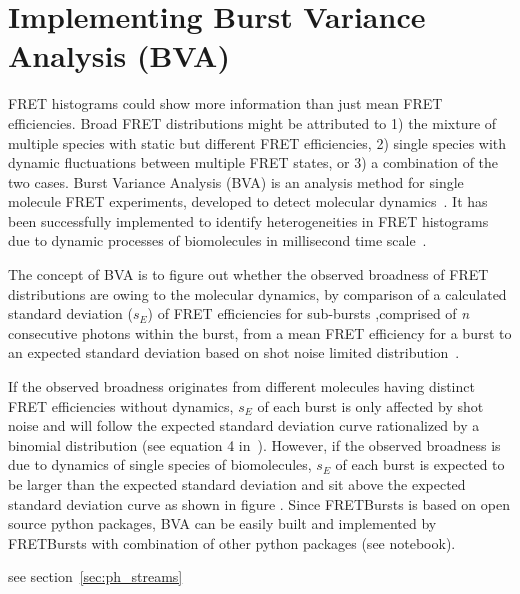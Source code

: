 \section{Implementing Burst Variance Analysis (BVA)}

FRET histograms could show more information than just mean FRET efficiencies. Broad FRET distributions might be attributed to 1) the mixture of multiple species with static but different FRET efficiencies, 2) single species with dynamic fluctuations between multiple FRET states, or 3) a combination of the two cases. Burst Variance Analysis (BVA) is an analysis method for single molecule FRET experiments, developed to detect molecular dynamics~\cite{Torella_2011}. It has been successfully implemented to identify heterogeneities in FRET histograms due to dynamic processes of biomolecules in millisecond time scale~\cite{Torella_2011, Robb_2013}.

The concept of BVA is to figure out whether the observed broadness of FRET distributions are owing to the molecular dynamics, by comparison of a calculated standard deviation ($s_E$) of FRET efficiencies for sub-bursts ,comprised of \textit{n} consecutive photons within the burst, from a mean FRET efficiency for a burst to an expected standard deviation based on shot noise limited distribution~\cite{Torella_2011}. 

If the observed broadness originates from different molecules having distinct FRET efficiencies without dynamics, $s_E$ of each burst is only affected by shot noise and will follow the expected standard deviation curve rationalized by a binomial distribution (see equation 4 in~\cite{Torella_2011}). However, if the observed broadness is due to dynamics of single species of biomolecules, $s_E$ of each burst is expected to be larger than the expected standard deviation and sit above the expected standard deviation curve as shown in figure .
Since FRETBursts is based on open source python packages, BVA can be easily built and implemented by FRETBursts with combination of other python packages (see notebook).  



see section~\ref{sec:ph_streams}